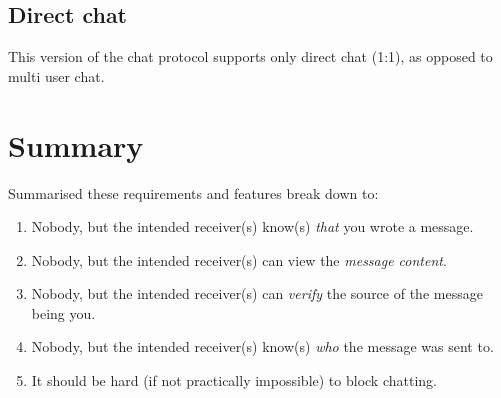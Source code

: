 \subsection{Direct chat}
This version of the chat protocol supports only direct chat (1:1), as opposed 
to multi user chat.
\section{Summary}
Summarised these requirements and features break down to:
\begin{enumerate}
\item Nobody, but the intended receiver(s) know(s) \emph{that} you wrote a message.
\item Nobody, but the intended receiver(s) can view the \emph{message content}.
\item Nobody, but the intended receiver(s) can \emph{verify} the source of the message being you.
\item Nobody, but the intended receiver(s) know(s) \emph{who} the message was sent to.
\item It should be hard (if not practically impossible) to block chatting.
\end{enumerate}
